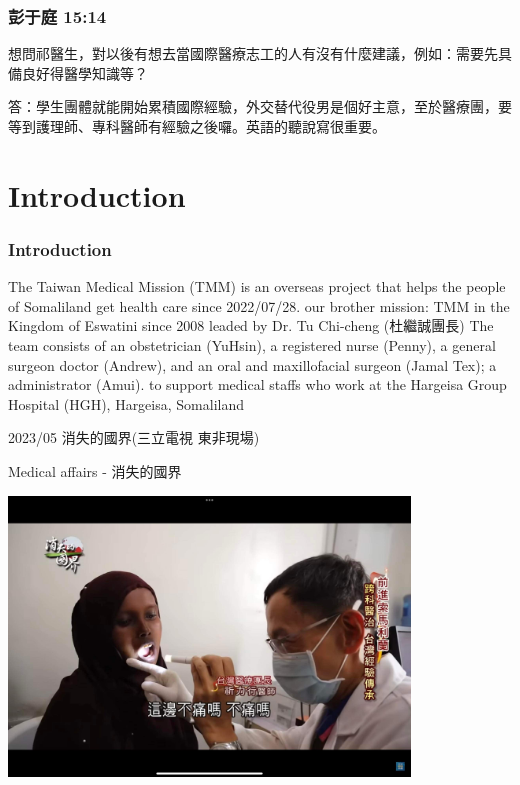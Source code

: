 \documentclass[aspectratio=169]{beamer}
\begin{document}
\begin{frame}
\frametitle{彭于庭 15:14}
想問祁醫生，對以後有想去當國際醫療志工的人有沒有什麼建議，例如：需要先具備良好得醫學知識等？

答：學生團體就能開始累積國際經驗，外交替代役男是個好主意，至於醫療團，要等到護理師、專科醫師有經驗之後囉。英語的聽說寫很重要。
\end{frame}




\section{Introduction}
\begin{frame}
\frametitle{Introduction}
\begin{outline}
    

\1 The Taiwan Medical Mission (TMM) is an overseas project that helps the people of Somaliland get health care since 2022/07/28.
    \2 our brother mission: TMM in the Kingdom of Eswatini since 2008 leaded by Dr. Tu Chi-cheng (杜繼誠團長)
\1 The team consists of %
    \2 an obstetrician (YuHsin), a registered nurse (Penny), a general surgeon doctor (Andrew), and an oral and maxillofacial surgeon (Jamal Tex); a administrator (Amui). 
    \2 to support medical staffs who work at the Hargeisa Group Hospital (HGH), Hargeisa, Somaliland



\end{outline}

2023/05 消失的國界(三立電視 東非現場)

\end{frame}


\begin{frame}{Medical affairs - 消失的國界}
    \begin{center}
        \includegraphics[width=0.8\textwidth]{IMG_4940(1).jpeg}

    \end{center}
\end{frame}
\end{document}
